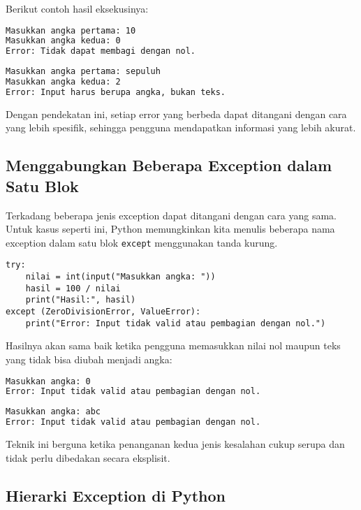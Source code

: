 Berikut contoh hasil eksekusinya:

\begin{lstlisting}[language=bash]
Masukkan angka pertama: 10
Masukkan angka kedua: 0
Error: Tidak dapat membagi dengan nol.
\end{lstlisting}

\begin{lstlisting}[language=bash]
Masukkan angka pertama: sepuluh
Masukkan angka kedua: 2
Error: Input harus berupa angka, bukan teks.
\end{lstlisting}

Dengan pendekatan ini, setiap error yang berbeda dapat ditangani dengan cara yang lebih spesifik, sehingga pengguna mendapatkan informasi yang lebih akurat.

\subsection*{Menggabungkan Beberapa Exception dalam Satu Blok}

Terkadang beberapa jenis exception dapat ditangani dengan cara yang sama. Untuk kasus seperti ini, Python memungkinkan kita menulis beberapa nama exception dalam satu blok \texttt{except} menggunakan tanda kurung.

\begin{lstlisting}[style=PythonStyle, caption={Menggabungkan beberapa exception dalam satu blok}]
try:
    nilai = int(input("Masukkan angka: "))
    hasil = 100 / nilai
    print("Hasil:", hasil)
except (ZeroDivisionError, ValueError):
    print("Error: Input tidak valid atau pembagian dengan nol.")
\end{lstlisting}

Hasilnya akan sama baik ketika pengguna memasukkan nilai nol maupun teks yang tidak bisa diubah menjadi angka:

\begin{lstlisting}[language=bash]
Masukkan angka: 0
Error: Input tidak valid atau pembagian dengan nol.
\end{lstlisting}

\begin{lstlisting}[language=bash]
Masukkan angka: abc
Error: Input tidak valid atau pembagian dengan nol.
\end{lstlisting}

Teknik ini berguna ketika penanganan kedua jenis kesalahan cukup serupa dan tidak perlu dibedakan secara eksplisit.

\subsection*{Hierarki Exception di Python}

